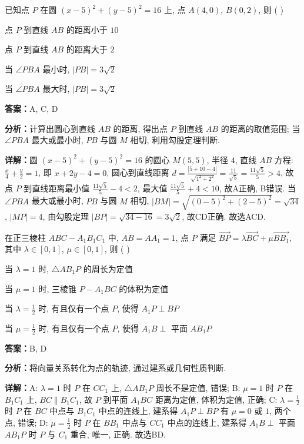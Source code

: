 \begin{question}[points=5]
已知点 $P$ 在圆 $(x-5)^2 + (y-5)^2 = 16$ 上, 点 $A(4,0)$, $B(0,2)$, 则 ( )
\begin{choices}
  \item 点 $P$ 到直线 $AB$ 的距离小于 $10$
  \item 点 $P$ 到直线 $AB$ 的距离大于 $2$
  \item 当 $\angle PBA$ 最小时, $|PB| = 3\sqrt{2}$
  \item 当 $\angle PBA$ 最大时, $|PB| = 3\sqrt{2}$
\end{choices}
\begin{solution}
\textbf{答案：}A, C, D

\textbf{分析：}计算出圆心到直线 $AB$ 的距离, 得出点 $P$ 到直线 $AB$ 的距离的取值范围; 当 $\angle PBA$ 最大或最小时, $PB$ 与圆 $M$ 相切, 利用勾股定理判断.

\textbf{详解：}圆 $(x-5)^2+(y-5)^2=16$ 的圆心 $M(5,5)$, 半径 $4$, 直线 $AB$ 方程: $\frac{x}{4}+\frac{y}{2}=1$, 即 $x+2y-4=0$, 圆心到直线距离 $d = \frac{|5+10-4|}{\sqrt{1^2+2^2}} = \frac{11}{\sqrt{5}} = \frac{11\sqrt{5}}{5} > 4$, 故点 $P$ 到直线距离最小值 $\frac{11\sqrt{5}}{5} - 4 < 2$, 最大值 $\frac{11\sqrt{5}}{5} + 4 < 10$, 故A正确, B错误. 当 $\angle PBA$ 最大或最小时, $PB$ 与圆 $M$ 相切, $|BM| = \sqrt{(0-5)^2+(2-5)^2} = \sqrt{34}$, $|MP| = 4$, 由勾股定理 $|BP| = \sqrt{34-16} = 3\sqrt{2}$, 故CD正确. 故选ACD.
\end{solution}
\end{question}

\begin{question}[points=5]
在正三棱柱 $ABC-A_1B_1C_1$ 中, $AB = AA_1 = 1$, 点 $P$ 满足 $\overrightarrow{BP} = \lambda \overrightarrow{BC} + \mu \overrightarrow{BB_1}$, 其中 $\lambda \in [0,1]$, $\mu \in [0,1]$, 则 ( )
\begin{choices}
  \item 当 $\lambda = 1$ 时, $\triangle AB_1P$ 的周长为定值
  \item 当 $\mu = 1$ 时, 三棱锥 $P-A_1BC$ 的体积为定值
  \item 当 $\lambda = \frac{1}{2}$ 时, 有且仅有一个点 $P$, 使得 $A_1P \perp BP$
  \item 当 $\mu = \frac{1}{2}$ 时, 有且仅有一个点 $P$, 使得 $A_1B \perp$ 平面 $AB_1P$
\end{choices}
\begin{solution}
\textbf{答案：}B, D

\textbf{分析：}将向量关系转化为点的轨迹, 通过建系或几何性质判断.

\textbf{详解：}A: $\lambda = 1$ 时 $P$ 在 $CC_1$ 上, $\triangle AB_1P$ 周长不是定值, 错误; B: $\mu = 1$ 时 $P$ 在 $B_1C_1$ 上, $BC \parallel B_1C_1$, 故 $P$ 到平面 $A_1BC$ 距离为定值, 体积为定值, 正确; C: $\lambda = \frac{1}{2}$ 时 $P$ 在 $BC$ 中点与 $B_1C_1$ 中点的连线上, 建系得 $A_1P \perp BP$ 有 $\mu=0$ 或 $1$, 两个点, 错误; D: $\mu = \frac{1}{2}$ 时 $P$ 在 $BB_1$ 中点与 $CC_1$ 中点的连线上, 建系得 $A_1B \perp$ 平面 $AB_1P$ 时 $P$ 与 $C_1$ 重合, 唯一, 正确. 故选BD.
\end{solution}
\end{question}

